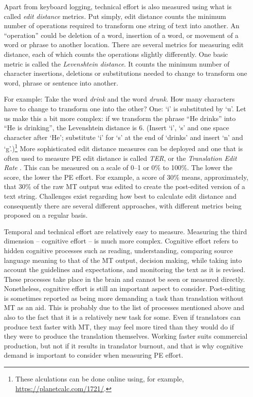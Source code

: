 \documentclass[output=paper,colorlinks,citecolor=brown]{langscibook}
\begin{document}
Apart from keyboard logging, technical effort is also measured using what is called \textit{edit distance} metrics. Put simply, edit distance counts the minimum number of operations required to transform one string of text into another. An “operation” could be deletion of a word, insertion of a word, or movement of a word or phrase to another location. There are several metrics for measuring edit distance, each of which counts the operations slightly differently. One basic metric is called the \textit{Levenshtein distance}. It counts the minimum number of character insertions, deletions or substitutions needed to change to transform one word, phrase or sentence into another. 

For example: Take the word \textit{drink} and the word \textit{drunk}. How many characters have to change to transform one into the other? One: ‘i’ is substituted by ‘u’. Let us make this a bit more complex: if we transform the phrase “He drinks” into “He is drinking”, the Levenshtein distance is 6. (Insert ‘i’, ‘s’ and one space character after ‘He’; substitute ‘i’ for ‘s’ at the end of ‘drinks’ and insert ‘n’ and ‘g’.)\footnote{These alculations can be done online using, for example, \url{https://planetcalc.com/1721/}.}  More sophisticated edit distance measures can be deployed and one that is often used to measure PE edit distance is called \textit{TER}, or the \textit{Translation Edit Rate} \citep{snover-etal-2006-study}. This can be measured on a scale of 0–1 or 0\% to 100\%. The lower the score, the lower the PE effort. For example, a score of 30\% means, approximately, that 30\% of the raw MT output was edited to create the post-edited version of a text string. Challenges exist regarding how best to calculate edit distance and consequently there are several different approaches, with different metrics being proposed on a regular basis.  

Temporal and technical effort are relatively easy to measure. Measuring the third dimension – cognitive effort – is much more complex. Cognitive effort refers to hidden cognitive processes such as reading, understanding, comparing source language meaning to that of the MT output, decision making, while taking into account the guidelines and expectations, and monitoring the text as it is revised. These processes take place in the brain and cannot be seen or measured directly. Nonetheless, cognitive effort is still an important aspect to consider. Post-editing is sometimes reported as being more demanding a task than translation without MT as an aid. This is probably due to the list of processes mentioned above and also to the fact that it is a relatively new task for some. Even if translators can produce text faster with MT, they may feel more tired than they would do if they were to produce the translation themselves. Working faster suits commercial production, but not if it results in translator burnout, and that is why cognitive demand is important to consider when measuring PE effort.
\end{document}

